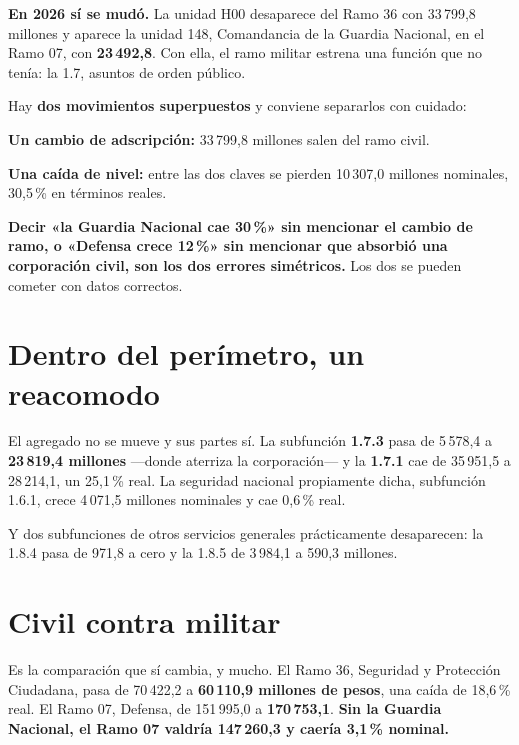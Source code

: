 \textbf{En 2026 sí se mudó.} La unidad H00 desaparece del Ramo 36 con 33\,799,8 millones y
aparece la unidad 148, Comandancia de la Guardia Nacional, en el Ramo 07, con
\textbf{23\,492,8}. Con ella, el ramo militar estrena una función que no tenía: la 1.7,
asuntos de orden público.

Hay \textbf{dos movimientos superpuestos} y conviene separarlos con cuidado:

\begin{list}{}{\setlength{\leftmargin}{1.4em}\setlength{\itemsep}{2pt}}
\item[$\bullet$] \textbf{Un cambio de adscripción:} 33\,799,8 millones salen del ramo civil.
\item[$\bullet$] \textbf{Una caída de nivel:} entre las dos claves se pierden 10\,307,0
millones nominales, 30,5\,\% en términos reales.
\end{list}

\textbf{Decir «la Guardia Nacional cae 30\,\%» sin mencionar el cambio de ramo, o «Defensa
crece 12\,\%» sin mencionar que absorbió una corporación civil, son los dos errores
simétricos.} Los dos se pueden cometer con datos correctos.

\section{Dentro del perímetro, un reacomodo}

El agregado no se mueve y sus partes sí. La subfunción \textbf{1.7.3} pasa de 5\,578,4 a
\textbf{23\,819,4 millones} ---donde aterriza la corporación--- y la \textbf{1.7.1} cae de
35\,951,5 a 28\,214,1, un 25,1\,\% real. La seguridad nacional propiamente dicha, subfunción
1.6.1, crece 4\,071,5 millones nominales y cae 0,6\,\% real.

Y dos subfunciones de otros servicios generales prácticamente desaparecen: la 1.8.4 pasa de
971,8 a cero y la 1.8.5 de 3\,984,1 a 590,3 millones.

\section{Civil contra militar}

Es la comparación que sí cambia, y mucho. El Ramo 36, Seguridad y Protección Ciudadana, pasa
de 70\,422,2 a \textbf{60\,110,9 millones de pesos}, una caída de 18,6\,\% real. El Ramo 07, Defensa, de 151\,995,0 a
\textbf{170\,753,1}. \textbf{Sin la Guardia Nacional, el Ramo 07 valdría 147\,260,3 y caería
3,1\,\% nominal.}

